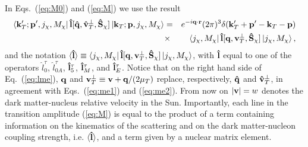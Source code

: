 \documentclass[11pt,a4paper]{article}
\begin{document}
In Eqs.~(\ref{eq:M0}) and (\ref{eq:M}) we use the result
\begin{eqnarray} 
\langle {\bf{k}}'_T;{\bf{p}}',j_\chi,M_\chi |\,{\bf{\hat{l}}}[{\bf{\hat{q}}},{\bf{\hat{v}}}^{\perp}_T,{\bf{\hat{S}}}_\chi]\,| {\bf{k}}_T;{\bf{p}},j_\chi,M_\chi \rangle &=&e^{-i {\bf{q}} \cdot {\bf{r}}} (2\pi)^3\delta({\bf k}'_T+{\bf p}'-{\bf k}_T-{\bf p})  \nonumber\\ &\times& \langle j_\chi,M_\chi |\,{\bf{\hat{l}}}[{\bf{q}},{\bf{v}}^{\perp}_T,{\bf{\hat{S}}}_\chi]\,| j_\chi,M_\chi \rangle \,,
\label{eq:lme}
\end{eqnarray}
and the notation $\langle {\bf{\hat{l}}} \rangle \equiv \langle j_\chi,M_\chi |\,{\bf{\hat{l}}}[{\bf{q}},{\bf{v}}^{\perp}_T,{\bf{\hat{S}}}_\chi]\,| j_\chi,M_\chi \rangle$, with ${\bf{\hat{l}}}$ equal to one of the operators $\hat{l}_0^\tau$, $\hat{l}_{0A}^{\tau}$, ${\bf{\hat{l}}}_5^\tau$, ${\bf{\hat{l}}}_M^\tau$, and ${\bf{\hat{l}}}_E^\tau$. Notice that on the right hand side of Eq.~(\ref{eq:lme}), ${\bf{q}}$ and ${\bf{v}}^{\perp}_T\equiv {\bf{v}} + {\bf{q}}/(2\mu_T)$ replace, respectively, ${\bf{\hat{q}}}$ and ${\bf{\hat{v}}}^{\perp}_T$, in agreement with Eqs.~(\ref{eq:me1}) and (\ref{eq:me2}). From now on $|{\bf{v}}|=w$ denotes the dark matter-nucleus relative velocity in the Sun. Importantly, each line in the transition amplitude (\ref{eq:M}) is equal to the product of a term containing information on the kinematics of the scattering and on the dark matter-nucleon coupling strength, i.e. $\langle {\bf{\hat{l}}}\rangle $, and a term given by a nuclear matrix element.
\end{document}
